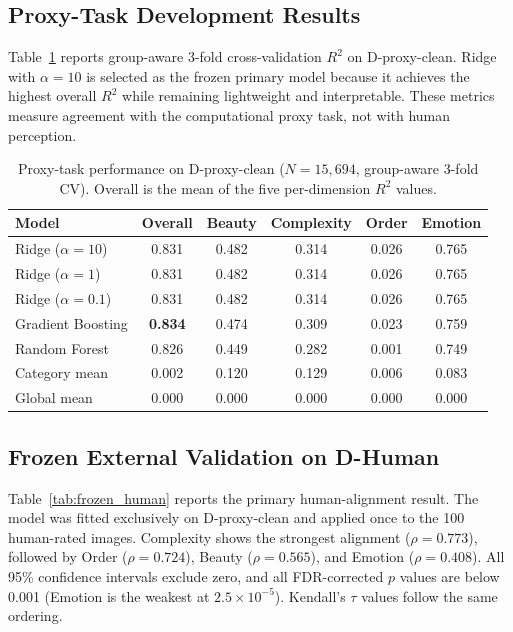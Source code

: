 \subsection{Proxy-Task Development Results}

Table~\ref{tab:proxy_cv} reports group-aware 3-fold cross-validation $R^2$ on D-proxy-clean. Ridge with $\alpha = 10$ is selected as the frozen primary model because it achieves the highest overall $R^2$ while remaining lightweight and interpretable. These metrics measure agreement with the computational proxy task, not with human perception.

\begin{table}[htbp]
\centering
\caption{Proxy-task performance on D-proxy-clean ($N = 15{,}694$, group-aware 3-fold CV). Overall is the mean of the five per-dimension $R^2$ values.}
\label{tab:proxy_cv}
\begin{tabular}{@{}lccccc@{}}
\toprule
Model & Overall & Beauty & Complexity & Order & Emotion \\
\midrule
Ridge ($\alpha = 10$) & 0.831 & 0.482 & 0.314 & 0.026 & 0.765 \\
Ridge ($\alpha = 1$) & 0.831 & 0.482 & 0.314 & 0.026 & 0.765 \\
Ridge ($\alpha = 0.1$) & 0.831 & 0.482 & 0.314 & 0.026 & 0.765 \\
Gradient Boosting & \textbf{0.834} & 0.474 & 0.309 & 0.023 & 0.759 \\
Random Forest & 0.826 & 0.449 & 0.282 & 0.001 & 0.749 \\
Category mean & 0.002 & 0.120 & 0.129 & 0.006 & 0.083 \\
Global mean & 0.000 & 0.000 & 0.000 & 0.000 & 0.000 \\
\bottomrule
\end{tabular}
\end{table}

\subsection{Frozen External Validation on D-Human}

Table~\ref{tab:frozen_human} reports the primary human-alignment result. The model was fitted exclusively on D-proxy-clean and applied once to the 100 human-rated images. Complexity shows the strongest alignment ($\rho = 0.773$), followed by Order ($\rho = 0.724$), Beauty ($\rho = 0.565$), and Emotion ($\rho = 0.408$). All 95\% confidence intervals exclude zero, and all FDR-corrected $p$ values are below 0.001 (Emotion is the weakest at $2.5 \times 10^{-5}$). Kendall's $\tau$ values follow the same ordering.

